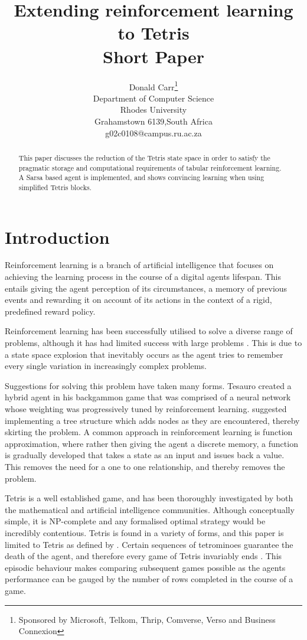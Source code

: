 \documentclass[a4paper,twocolumn]{article}
\title{Extending reinforcement learning to Tetris \\ Short Paper}
\author{Donald Carr\thanks{Sponsored by Microsoft, Telkom, Thrip, Comverse, Verso and Business Connexion} \\ Department of Computer Science \\ Rhodes University \\ Grahamstown 6139,South Africa \\ g02c0108@campus.ru.ac.za}
\begin{document}
\maketitle

\begin{abstract}
This paper discusses the reduction of the Tetris state space in order to satisfy the pragmatic storage and computational requirements of tabular reinforcement learning. A Sarsa based agent is implemented, and shows convincing learning when using simplified Tetris blocks.
\end{abstract}

\section{Introduction}

Reinforcement learning is a branch of artificial intelligence that focuses on achieving the learning process in the course of a digital agents lifespan. This entails giving the agent perception of its circumstances, a memory of previous events and rewarding it on account of its actions in the context of a rigid, predefined reward policy. 

Reinforcement learning has been successfully utilised to solve a diverse range of problems, although it has had limited success with large problems \citep{keepaway}. This is due to a state space explosion that inevitably occurs as the agent tries to remember every single variation in increasingly complex problems.

Suggestions for solving this problem have taken many forms. Tesauro \citep{tdgammon} created a hybrid agent in his backgammon game that was comprised of a neural network whose weighting was progressively tuned by reinforcement learning. \cite{kurt} suggested implementing a tree structure which adds nodes as they are encountered, thereby skirting the problem. A common approach in reinforcement learning is function approximation, where rather then giving the agent a discrete memory, a function is gradually developed that takes a state as an input and issues back a value. This removes the need for a one to one relationship, and thereby removes the problem. 

Tetris is a well established game, and has been thoroughly investigated by both the mathematical and artificial intelligence communities. Although conceptually simple, it is NP-complete \citep{hardtet} and any formalised optimal strategy would be incredibly contentious. Tetris is found in a variety of forms, and this paper is limited to Tetris as defined by \cite{tetstand}. Certain sequences of tetrominoes guarantee the death of the agent, and therefore every game of Tetris invariably ends \citep{mathproof,losetetris}. This episodic behaviour makes comparing subsequent games possible as the agents performance can be gauged by the number of rows completed in the course of a game.
\end{document}
